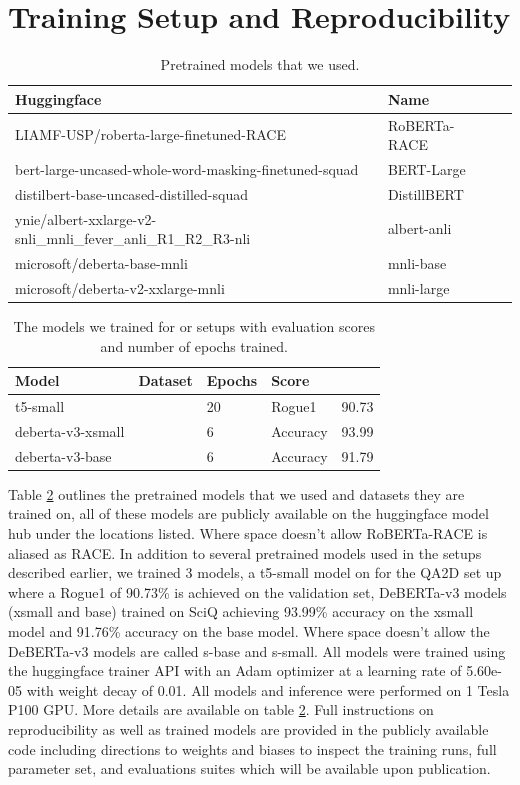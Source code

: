 \documentclass[11pt]{article}
\begin{document}
\section{Training Setup and Reproducibility}
\label{sec:appendix}
\begin{table}[]
\centering
\begin{tabular}{lll}
\hline
Huggingface & Name \\ \hline
LIAMF-USP/roberta-large-finetuned-RACE & RoBERTa-RACE \\
bert-large-uncased-whole-word-masking-finetuned-squad & BERT-Large \\
distilbert-base-uncased-distilled-squad & DistillBERT \\
ynie/albert-xxlarge-v2-snli\_mnli\_fever\_anli\_R1\_R2\_R3-nli & albert-anli \\
microsoft/deberta-base-mnli & mnli-base \\
microsoft/deberta-v2-xxlarge-mnli & mnli-large \\ \hline
\end{tabular}
\caption{Pretrained models that we used.}
\label{tab:models_trained}
\end{table}
\begin{table}[]
\centering
\begin{tabular}{lllll}
\hline
Model & Dataset & Epochs & Score &  \\ \hline
t5-small & \citet{demszky_transforming_2018} & 20 & Rogue1 & 90.73 \\
deberta-v3-xsmall & \citet{welbl_crowdsourcing_2017} & 6 & Accuracy & 93.99 \\
deberta-v3-base & \citet{welbl_crowdsourcing_2017} & 6 & Accuracy & 91.79 \\ \hline
\end{tabular}
\caption{The models we trained for or setups with evaluation scores and number of epochs trained.}
\label{tab:models_trained}
\end{table}
Table \ref{tab:models_trained} outlines the pretrained models that we used and datasets they are trained on, all of these models are publicly available on the huggingface model hub under the locations listed. Where space doesn't allow RoBERTa-RACE is aliased as RACE.
In addition to several pretrained models used in the setups described earlier, we trained 3 models, a t5-small model on \citet{demszky_transforming_2018} for the QA2D set up where a Rogue1 of 90.73\% is achieved on the validation set, DeBERTa-v3 models (xsmall and base) trained on SciQ \citep{welbl_crowdsourcing_2017} achieving 93.99\% accuracy on the xsmall model and 91.76\% accuracy on the base model. Where space doesn't allow the DeBERTa-v3 models are called s-base and s-small. All models were trained using the huggingface trainer API \citep{wolf_huggingfaces_2020} with an Adam optimizer at a learning rate of 5.60e-05 with weight decay of 0.01. All models and inference were performed on 1 Tesla P100 GPU. More details are available on table \ref{tab:models_trained}.
Full instructions on reproducibility as well as trained models are provided in the publicly available code including directions to weights and biases to inspect the training runs, full parameter set, and evaluations suites which will be available upon publication.
\end{document}
